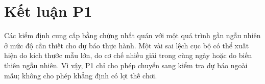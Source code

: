 \section{Kết luận P1}
Các kiểm định cung cấp bằng chứng nhất quán với một quá trình gần ngẫu nhiên ở mức độ cần thiết cho dự báo thực hành. Một vài sai lệch cục bộ có thể xuất hiện do kích thước mẫu lớn, do cơ chế nhiều giải trong cùng ngày hoặc do biến thiên ngẫu nhiên. Vì vậy, P1 chỉ cho phép chuyển sang kiểm tra dự báo ngoài mẫu; không cho phép khẳng định có lợi thế chơi.
